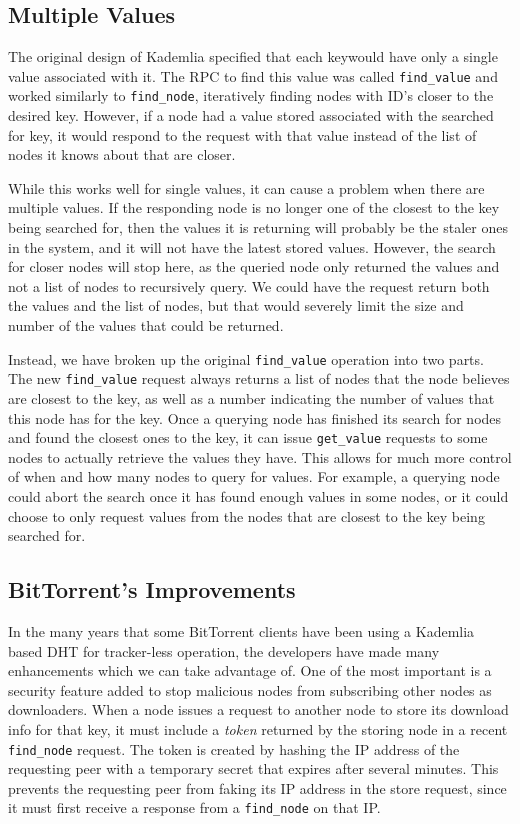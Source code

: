 \documentclass[conference]{IEEEtran}
\begin{document}
\subsection{Multiple Values}
\label{multiple_values}

The original design of Kademlia specified that each keywould have
only a single value associated with it. The RPC to find this value
was called \texttt{find\_value} and worked similarly to
\texttt{find\_node}, iteratively finding nodes with ID's closer to
the desired key. However, if a node had a value stored associated
with the searched for key, it would respond to the request with that
value instead of the list of nodes it knows about that are closer.

While this works well for single values, it can cause a problem when
there are multiple values. If the responding node is no longer one
of the closest to the key being searched for, then the values it is
returning will probably be the staler ones in the system, and it
will not have the latest stored values. However, the search for
closer nodes will stop here, as the queried node only returned the
values and not a list of nodes to recursively query. We could have
the request return both the values and the list of nodes, but that
would severely limit the size and number of the values that could be
returned.

Instead, we have broken up the original \texttt{find\_value}
operation into two parts. The new \texttt{find\_value} request
always returns a list of nodes that the node believes are closest to
the key, as well as a number indicating the number of values that
this node has for the key. Once a querying node has finished its
search for nodes and found the closest ones to the key, it can issue
\texttt{get\_value} requests to some nodes to actually retrieve the
values they have. This allows for much more control of when and how
many nodes to query for values. For example, a querying node could
abort the search once it has found enough values in some nodes, or
it could choose to only request values from the nodes that are
closest to the key being searched for.

\subsection{BitTorrent's Improvements}
\label{bittorrent_dht}

In the many years that some BitTorrent clients have been using a
Kademlia based DHT for tracker-less operation, the developers have
made many enhancements which we can take advantage of. One of the
most important is a security feature added to stop malicious nodes
from subscribing other nodes as downloaders. When a node issues a
request to another node to store its download info for that key, it
must include a \emph{token} returned by the storing node in a recent
\texttt{find\_node} request. The token is created by hashing the IP
address of the requesting peer with a temporary secret that expires
after several minutes. This prevents the requesting peer from faking
its IP address in the store request, since it must first receive a
response from a \texttt{find\_node} on that IP.
\end{document}
